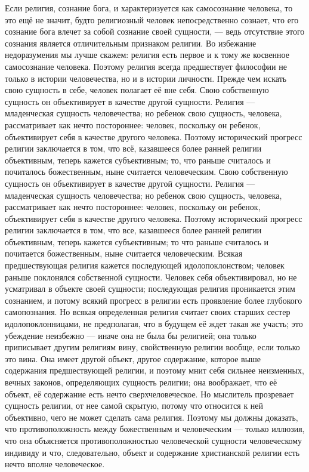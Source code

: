 \documentclass[12pt,oneside]{book}
\begin{document}
Если религия, сознание бога, и характеризуется как самосознание человека, то это ещё не значит, будто религиозный человек непосредственно сознает, что его сознание бога влечет за собой сознание своей сущности, --- ведь отсутствие этого сознания является отличительным признаком религии. Во избежание недоразумения мы лучше скажем: религия есть первое и к тому же косвенное самосознание человека. Поэтому религия всегда предшествует философии не только в истории человечества, но и в истории личности. Прежде чем искать свою сущность в себе, человек полагает её вне себя. Свою собственную сущность он объективирует в качестве другой сущности. Религия --- младенческая сущность человечества; но ребенок свою сущность, человека, рассматривает как нечто постороннее: человек, поскольку он ребенок, объективирует себя в качестве другого человека. Поэтому исторический прогресс религии заключается в том, что всё, казавшееся более ранней религии объективным, теперь кажется субъективным; то, что раньше считалось и почиталось божественным, ныне считается человеческим. Свою собственную сущность он объективирует в качестве другой сущности. Религия --- младенческая сущность человечества; но ребенок свою сущность, человека, рассматривает как нечто постороннее: человек, поскольку он ребенок, объективирует себя в качестве другого человека. Поэтому исторический прогресс религии заключается в том, что все, казавшееся более ранней религии объективным, теперь кажется субъективным; то что раньше считалось и почитается божественным, ныне считается человеческим. Всякая предшествующая религия кажется последующей идолопоклонством; человек раньше поклонялся собственной сущности. Человек себя объективировал, но не усматривал в объекте своей сущности; последующая религия проникается этим сознанием, и потому всякий прогресс в религии есть проявление более глубокого самопознания. Но всякая определенная религия считает своих старших сестер идолопоклонницами, не предполагая, что в будущем её ждет такая же участь; это убеждение неизбежно --- иначе она не была бы религией; она только приписывает другим религиям вину, свойственную религии вообще, если только это вина. Она имеет другой объект, другое содержание, которое выше содержания предшествующей религии, и поэтому мнит себя сильнее неизменных, вечных законов, определяющих сущность религии; она воображает, что её объект, её содержание есть нечто сверхчеловеческое. Но мыслитель прозревает сущность религии, от нее самой скрытую, потому что относится к ней объективно, чего не может сделать сама религия. Поэтому мы должны доказать, что противоположность между божественным и человеческим --- только иллюзия, что она объясняется противоположностью человеческой сущности человеческому индивиду и что, следовательно, объект и содержание христианской религии есть нечто вполне человеческое.
\end{document}
